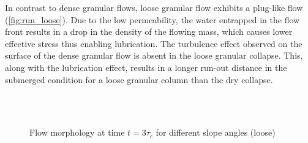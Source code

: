 In contrast to dense granular flows, loose granular flow exhibits a plug-like 
flow (\cref{fig:run_loose}). Due to the low permeability, the 
water entrapped in the flow front results in a drop in the density of the 
flowing mass, which causes lower effective stress thus enabling lubrication. 
The turbulence effect observed on the surface of the dense granular flow is 
absent in the loose granular collapse. This, along with the lubrication effect, 
results in a longer run-out distance in the submerged condition for a loose 
granular column than the dry collapse. 

\begin{figure}
\\

\\

\caption{Flow morphology at time $t = 3\tau_c$ for different slope angles 
(loose)}
\label{fig:slope_loose}
\end{figure}


